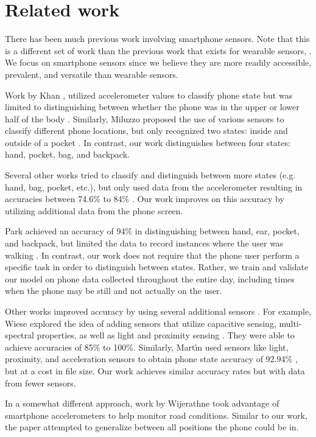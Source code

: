 \section{Related work}
There has been much previous work involving smartphone sensors.
Note that this is a different set of work than the previous work that exists for wearable sensors, \cite{Kunze2005,Atallah}.
We focus on smartphone sensors since we believe they are more readily accessible, prevalent, and versatile than wearable sensors.

Work by Khan \et, utilized accelerometer values to classify phone state 
but was limited to distinguishing between whether the phone was in the upper or lower half of the body \cite{Khan2010}.
Similarly, Miluzzo \et proposed the use of various sensors to classify different phone locations, 
but only recognized two states: inside and outside of a pocket \cite{Miluzzo2010}.
In contrast, our work distinguishes between four states: hand, pocket, bag, and backpack. 

Several other works tried to classify and distinguish between more states (e.g. hand, bag, pocket, etc.), but only used data from the accelerometer resulting in accuracies between 74.6\% to 84\% \cite{Fujinami2013,Coksun15}. 
Our work improves on this accuracy by utilizing additional data from the phone screen.

Park \et achieved an accuracy of 94\% in distinguishing between hand, ear, pocket, and backpack, but limited the data to record instances where the user was walking \cite{Park2012}. 
In contrast, our work does not require that the phone user perform a specific task in order to distinguish between states.
Rather, we train and validate our model on phone data collected throughout the entire day, 
 including times when the phone may be still and not actually on the user. 

Other works improved accuracy by using several additional sensors \cite{Yang13}.
For example, Wiese \et explored the idea of adding sensors that utilize capacitive sensing,  multi-spectral properties, as well as light and proximity sensing \cite{Wiese2013}.
They were able to achieve accuracies of 85\% to 100\%.
Similarly, Mart\'{\i}n \et used sensors like light, proximity, and acceleration sensors
to obtain phone state accuracy of 92.94\% \cite{Martin2013}, but at a cost in file size.
Our work achieves similar accuracy rates but with data from fewer sensors.  

In a somewhat different approach, work by Wijerathne \et \cite{Wijerathne} took advantage of smartphone accelerometers to help monitor road conditions. Similar to our work, the paper attempted to generalize between all positions the phone could be in. 

